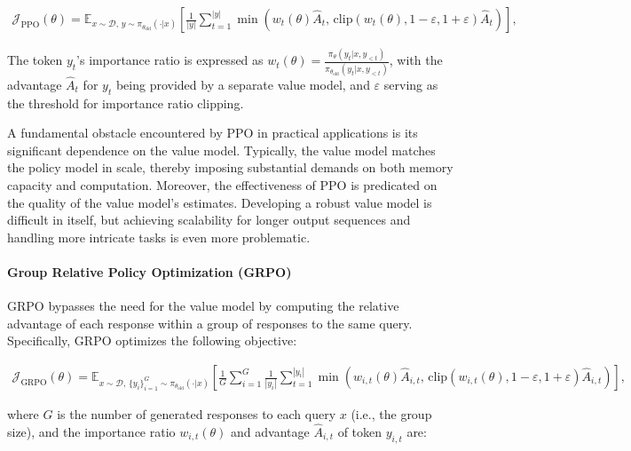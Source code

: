 \begin{align}
\mathcal{J}_\text{PPO}(\theta) = \mathbb{E}_{ x \sim \mathcal{D},\, y \sim \pi_{\theta_\text{old}}( \cdot | x) }
\left[ \frac{1}{|y|} \sum_{t=1}^{|y|} 
\min \left( w_{t}(\theta) \widehat{A}_{t},  \, \mathrm{clip} \left( w_{t}(\theta), 1 - {\varepsilon}, 1 + {\varepsilon}\right) \widehat{A}_{t} \right)
\right],
\end{align}

The token $y_t$'s importance ratio is expressed as $
w_{t}(\theta) = \frac{ \pi_{\theta} (y_{t} | x, y_{<t}) }{ \pi_{\theta_\text{old}} (y_{t} | x,y_{<t})} $, with the advantage $\widehat{A}_{t}$ for $y_t$ being provided by a separate value model, and $\varepsilon$ serving as the threshold for importance ratio clipping.

A fundamental obstacle encountered by PPO in practical applications is its significant dependence on the value model. Typically, the value model matches the policy model in scale, thereby imposing substantial demands on both memory capacity and computation. Moreover, the effectiveness of PPO is predicated on the quality of the value model's estimates. Developing a robust value model is difficult in itself, but achieving scalability for longer output sequences and handling more intricate tasks is even more problematic.

\paragraph{Group Relative Policy Optimization (GRPO)} GRPO \citep{grpo} bypasses the need for the value model by computing the relative advantage of each response within a group of responses to the same query. Specifically, GRPO optimizes the following objective:

\begin{align}
\label{equ:grpo}
\mathcal{J}_\text{GRPO}(\theta) = \mathbb{E}_{ x \sim \mathcal{D},\, \{y_i\}_{i=1}^G \sim \pi_{\theta_\text{old}}( \cdot | x) }
\left[ \frac{1}{G} \sum_{i=1}^{G} \frac{1}{|y_i|} \sum_{t=1}^{|y_i|} 
\min \left( w_{i,t}(\theta) \widehat{A}_{i,t},  \, \mathrm{clip} \left( w_{i,t}(\theta), 1 - {\varepsilon}, 1 + {\varepsilon}\right) \widehat{A}_{i,t} \right)
\right],
\end{align}

where $G$ is the number of generated responses to each query $x$ (i.e., the group size), and the importance ratio $w_{i,t}(\theta)$ and advantage $\widehat{A}_{i,t}$ of token $y_{i,t}$ are:

